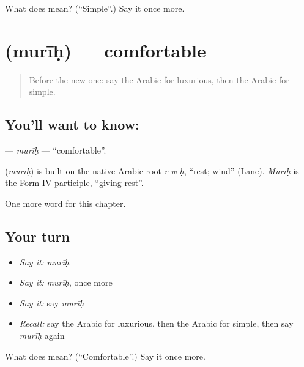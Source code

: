 \begin{tcolorbox}[breakable,colback=teal!4,colframe=teal!35!black,title={Before you move on}]
What does  mean? (\textquotedblleft{}Simple\textquotedblright{}.) Say it once more.
\end{tcolorbox}
\section[\texorpdfstring{\ar{مريح} (murīḥ)}{مريح (murīḥ)}]{ (murīḥ) — comfortable}

\label{lesson:AR-C145-murih}



\begin{quote}
Before the new one: say the Arabic for luxurious, then the Arabic for simple.
\end{quote}

\subsection*{You'll want to know: }
\textbf{} — \emph{murīḥ} — \textquotedblleft{}comfortable\textquotedblright{}.

\begin{cousinweb}
\textbf{} (\emph{murīḥ}) is built on the native Arabic root \emph{r-w-ḥ}, \textquotedblleft{}rest; wind\textquotedblright{} (Lane). \emph{Murīḥ} is the Form IV participle, \textquotedblleft{}giving rest\textquotedblright{}.
\end{cousinweb}

\begin{grammarlens}[title={What you've built}]
One more word for this chapter.
\end{grammarlens}

\subsection*{Your turn}
\begin{itemize}
\raggedright
  \item \emph{Say it:} \emph{murīḥ}
  \item \emph{Say it:} \emph{murīḥ}, once more
  \item \emph{Say it:} say \emph{murīḥ}
  \item \emph{Recall:} say the Arabic for luxurious, then the Arabic for simple, then say \emph{murīḥ} again
\end{itemize}

\begin{tcolorbox}[breakable,colback=teal!4,colframe=teal!35!black,title={Before you move on}]
What does  mean? (\textquotedblleft{}Comfortable\textquotedblright{}.) Say it once more.
\end{tcolorbox}
